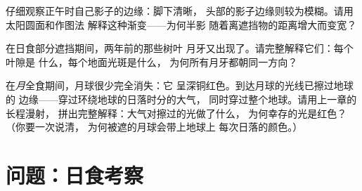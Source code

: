\begin{exercise}[$\star\star$]\label{exo:g7:shadows-eclipses:10}
仔细观察正午时自己影子的边缘：脚下清晰，
头部的影子边缘则较为模糊。请用太阳圆面和作图法
解释这种渐变——为何半影
随着离遮挡物的距离增大而变宽？
\end{exercise}

\begin{exercise}[$\star\star$]\label{exo:g7:shadows-eclipses:11}
在日食部分遮挡期间，两年前的那些树叶
月牙又出现了。请完整解释它们：每个叶隙是
什么，每个地面光斑是什么，
为何所有月牙都朝同一方向？
\end{exercise}

\begin{exercise}[$\star\star\star$]\label{exo:g7:shadows-eclipses:12}
在\emph{月}全食期间，月球很少完全消失：它
呈深铜红色。到达月球的光线已擦过地球的
边缘——穿过环绕地球的日落时分的大气，
同时穿过整个地球。请用上一章的长程漫射，
拼出完整解释：大气对擦过的光做了什么，
为何幸存的光是红色？（你要一次说清，
为何被遮的月球会带上地球上
每次日落的颜色。）
\end{exercise}

\section{问题：日食考察}

